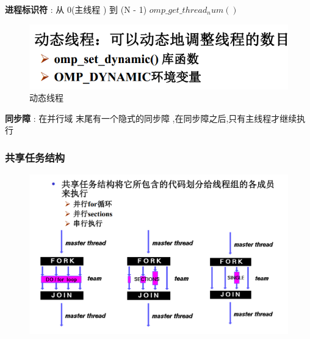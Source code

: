 \documentclass[UTF8,a4paper]{ctexart}
\begin{document}
\textbf{进程标识符} : 从 0(主线程 ) 到 (N - 1) $omp\_get\_thread_num()$
\begin{figure}[H]
  \centering
  \includegraphics[scale = 0.3]{assets/ParallelComputing_d66c9.png}
  \caption{动态线程}
\end{figure}

\textbf{同步障} : 在并行域 末尾有一个隐式的同步障 ,在同步障之后,只有主线程才继续执行

\subsubsection{共享任务结构}
\begin{figure}[H]
  \centering
  \includegraphics[scale = 0.3]{assets/ParallelComputing_72fb3.png}
\end{figure}
\end{document}
